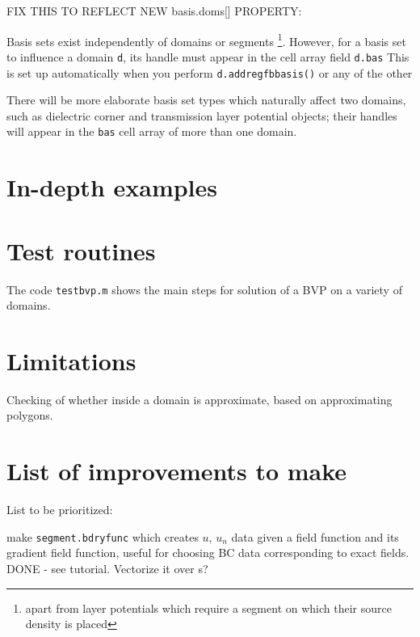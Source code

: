 \documentclass[12pt]{article}
\begin{document}
FIX THIS TO REFLECT NEW basis.doms[] PROPERTY:

Basis sets exist independently of domains or segments
\footnote{apart from layer potentials which require a segment on which
their source density is placed}.
However, for a basis set to influence a domain {\tt d}, its handle must appear
in the cell array field {\tt d.bas}
This is set up automatically when you perform {\tt d.addregfbbasis()}
or any of the other 

There will be more elaborate basis set types which naturally affect two domains,
such as dielectric corner and transmission layer potential objects;
their handles will appear in the {\tt bas} cell array of more than one domain.


\section{In-depth examples}

\section{Test routines}

The code {\tt testbvp.m} shows the main steps for solution of a BVP on
a variety of domains.

\section{Limitations}

\bi
\item Checking of whether inside a domain is approximate, based on approximating
polygons.
\ei

\section{List of improvements to make}

List to be prioritized:

\bi
\item make {\tt segment.bdryfunc} which creates $u$, $u_n$ data given a
field function and its gradient field function, useful for choosing BC
data corresponding to exact fields. DONE - see tutorial.
Vectorize it over s?
\end{document}
